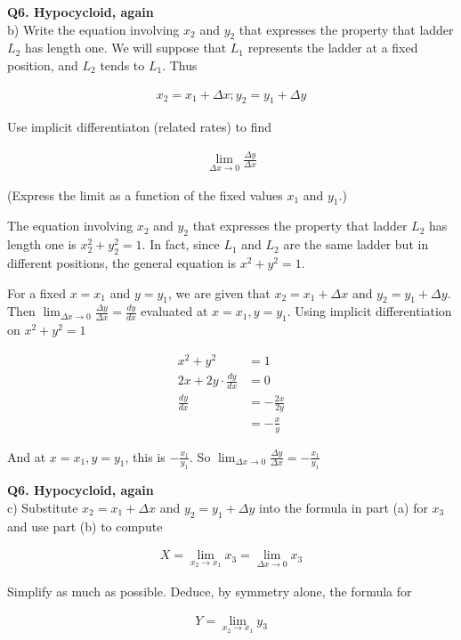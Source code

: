 \documentclass[9pt]{article}
\begin{document}
\begin{tcolorbox}
  \textbf{Q6. Hypocycloid, again} \\
  b) Write the equation involving $x_2$ and $y_2$ that expresses the property that ladder $L_2$ has length one. We will suppose that $L_1$ represents the ladder at a fixed position, and $L_2$ tends to $L_1$. Thus

  \begin{align*}
    x_2 = x_1 + \Delta x; y_2 = y_1 + \Delta y
  \end{align*}

  Use implicit differentiaton (related rates) to find

  \begin{align*}
    \lim_{\Delta x \rightarrow 0}\frac{\Delta y}{\Delta x}
  \end{align*}

  (Express the limit as a function of the fixed values $x_1$ and $y_1$.)
\end{tcolorbox}

The equation involving $x_2$ and $y_2$ that expresses the property that ladder $L_2$ has length one is $x_2^2 + y_2^2 = 1$. In fact, since $L_1$ and $L_2$ are the same ladder but in different positions, the general equation is $x^2 + y^2 = 1$.

For a fixed $x = x_1$ and $y = y_1$, we are given that $x_2 = x_1 + \Delta x$ and $y_2 = y_1 + \Delta y$. Then $\lim_{\Delta x \rightarrow 0}\frac{\Delta y}{\Delta x} = \frac{dy}{dx}$ evaluated at $x = x_1, y = y_1$. Using implicit differentiation on $x^2 + y^2 = 1$

\begin{align*}
  x^2 + y^2 &= 1 \\
  2x + 2y \cdot \frac{dy}{dx} &= 0 \\
  \frac{dy}{dx} &= -\frac{2x}{2y} \\
                &= -\frac{x}{y}
\end{align*}

And at $x = x_1, y = y_1$, this is $-\frac{x_1}{y_1}$. So $\lim_{\Delta x \rightarrow 0}\frac{\Delta y}{\Delta x} = -\frac{x_1}{y_1}$

\begin{tcolorbox}
  \textbf{Q6. Hypocycloid, again} \\
  c) Substitute $x_2 = x_1 + \Delta x$ and $y_2 = y_1 + \Delta y$ into the formula in part (a) for $x_3$ and use part (b) to compute

  \begin{align*}
    X = \lim_{x_2 \rightarrow x_1} x_3 = \lim_{\Delta x \rightarrow 0} x_3
  \end{align*}

  Simplify as much as possible. Deduce, by symmetry alone, the formula for

  \begin{align*}
    Y = \lim_{x_2 \rightarrow x_1} y_3
  \end{align*}
\end{tcolorbox}
\end{document}
